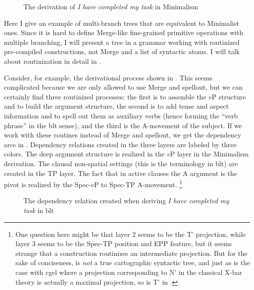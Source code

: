 \documentclass[../main.tex]{subfiles}
\begin{document}
\begin{figure}
    \centering
    
    \caption{The derivation of \emph{I have completed my task} in Minimalism}
    \label{fig:complete-my-task-minimalism}
\end{figure}

Here I give an example of multi-branch trees that are equivalent to Minimalist ones.
Since it is hard to define Merge-like fine-grained primitive operations with multiple branching,
I will present a tree in a grammar working with routinized pre-compiled constructions, 
not Merge and a list of syntactic atoms. I will talk about routinization in detail in . 

Consider, for example, the derivational process shown in .
This seems complicated because we are only allowed to use Merge and spellout, 
but we can certainly find three routinized processes: 
the first is to assemble the $v$P structure and to build the argument structure, 
the second is to add tense and aspect information and to spell out them as auxiliary verbs
(hence forming the ``verb phrase'' in the \ac{blt} sense), 
and the third is the A-movement of the subject.
If we work with these routines instead of Merge and spellout, 
we get the dependency arcs in .
Dependency relations created in the three layers are labeled by three colors.
The deep argument structure is realized in the $v$P layer in the Minimalism derivation.
The clausal non-spatial settings (this is the terminology in \ac{blt}) are created in the TP layer.
The fact that in active clauses the A argument is the pivot is realized by the Spec-$v$P to Spec-TP A-movement.%
\footnote{One question here might be that layer 2 seems to be the T' projection, 
while layer 3 seems to be the Spec-TP position and EPP feature, 
but it seems strange that a construction routinizes an intermediate projection. 
But for the sake of conciseness, 
 is \emph{not} a true cartographic syntactic tree, 
and just as is the case with \ac{cgel} where 
a projection corresponding to N' in the classical X-bar theory is actually a maximal projection, 
so is T' in .}

\begin{figure}
    \centering 
    
    \caption{The dependency relation created when deriving \emph{I have completed my task} in \ac{blt}}
    \label{fig:complete-my-task-dep}
\end{figure}
\end{document}

